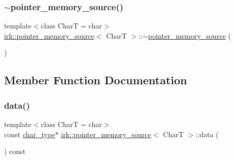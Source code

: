 \mbox{\label{classirk_1_1pointer__memory__source_a3d263637827d034a1dae482f02e487b5}} 
\subsubsection{\texorpdfstring{$\sim$pointer\+\_\+memory\+\_\+source()}{~pointer\_memory\_source()}}
{\footnotesize\ttfamily template$<$class CharT  = char$>$ \\
\mbox{\hyperlink{classirk_1_1pointer__memory__source}{irk\+::pointer\+\_\+memory\+\_\+source}}$<$ CharT $>$\+::$\sim$\mbox{\hyperlink{classirk_1_1pointer__memory__source}{pointer\+\_\+memory\+\_\+source}} (\begin{DoxyParamCaption}{ }\end{DoxyParamCaption})\hspace{0.3cm}{\ttfamily [default]}}



\subsection{Member Function Documentation}
\mbox{\label{classirk_1_1pointer__memory__source_a563d794f484d7e6812714e4fe23bcd08}} 
\subsubsection{\texorpdfstring{data()}{data()}}
{\footnotesize\ttfamily template$<$class CharT  = char$>$ \\
const \mbox{\hyperlink{classirk_1_1pointer__memory__source_a4b778df8efee229fdafbd4de413dbf61}{char\+\_\+type}}$\ast$ \mbox{\hyperlink{classirk_1_1pointer__memory__source}{irk\+::pointer\+\_\+memory\+\_\+source}}$<$ CharT $>$\+::data (\begin{DoxyParamCaption}{ }\end{DoxyParamCaption}) const\hspace{0.3cm}{\ttfamily [inline]}}

